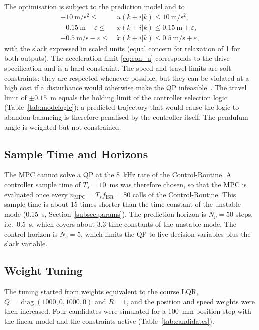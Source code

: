 The optimisation is subject to the prediction model and to
\begin{align}
  -10~\mathrm{m/s^2} \le\ & u(k+i|k) \le 10~\mathrm{m/s^2},
  \label{eq:con_u}\\
  -0.15~\mathrm{m} - \varepsilon \le\ & x(k+i|k) \le 0.15~\mathrm{m} + \varepsilon,
  \label{eq:con_x}\\
  -0.5~\mathrm{m/s} - \varepsilon \le\ & \dot{x}(k+i|k) \le 0.5~\mathrm{m/s} + \varepsilon,
  \label{eq:con_v}
\end{align}
with the slack expressed in scaled units (equal concern for relaxation of 1
for both outputs). The acceleration limit \eqref{eq:con_u} corresponds to the
drive specification and is a hard constraint. The speed and travel limits are
soft constraints: they are respected whenever possible, but they can be
violated at a high cost if a disturbance would otherwise make the \ac{QP}
infeasible~\cite{rawlings2000}. The travel limit of $\pm 0.15$~m equals the
holding limit of the controller selection logic (Table~\ref{tab:modelogic});
a predicted trajectory that would cause the logic to abandon balancing is
therefore penalised by the controller itself. The pendulum angle is weighted but not
constrained.

\subsection{Sample Time and Horizons}
\label{subsec:horizons}

The \ac{MPC} cannot solve a \ac{QP} at the 8~kHz rate of the Control-Routine.
A controller sample time of $T_s = 10$~ms was therefore chosen, so that the
\ac{MPC} is evaluated once every $n_{\mathrm{MPC}} = T_s f_{\mathrm{ISR}} = 80$
calls of the Control-Routine. This sample time is about 15 times shorter than
the time constant of the unstable mode (0.15~s, Section~\ref{subsec:params}).
The prediction horizon is $N_p = 50$ steps, i.e.\ 0.5~s, which covers about
3.3 time constants of the unstable mode. The control horizon is $N_c = 5$,
which limits the \ac{QP} to five decision variables plus the slack variable.

\subsection{Weight Tuning}
\label{subsec:tuning}

The tuning started from weights equivalent to the course \ac{LQR},
$Q = \operatorname{diag}(1000, 0, 1000, 0)$ and $R = 1$, and the position and
speed weights were then increased. Four candidates were simulated for a
100~mm position step with the linear model and the constraints active
(Table~\ref{tab:candidates}).

